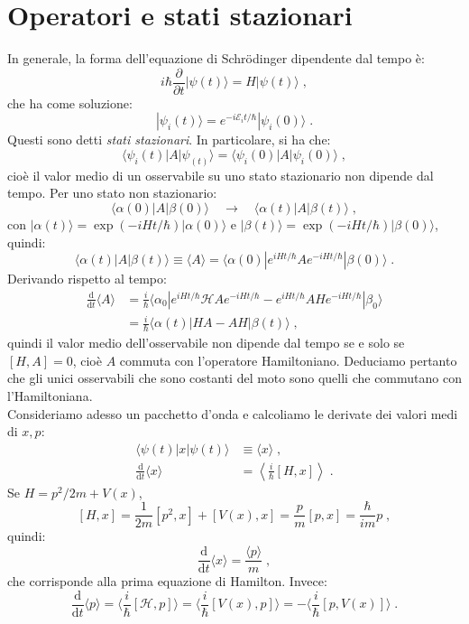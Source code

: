 \documentclass[12pt,a4paper]{report}
\theoremstyle{definition}
\newcommand{\ham}{\mathcal{H}}
\numberwithin{equation}{section}
\newcommand{\diff}[1][]{\mathrm{d}#1}
\newcommand{\bra}{\langle}
\newcommand{\ket}{\rangle}
\begin{document}
\section{Operatori e stati stazionari}
In generale, la forma dell'equazione di Schrödinger dipendente dal tempo è:
$$
i\hbar\frac{\partial}{\partial t}|\psi(t)\ket=H|\psi(t)\ket\;,
$$
che ha come soluzione:
$$
|\psi_i(t)\ket=e^{-i\mathcal{E}_it/\hbar}|\psi_i(0)\ket\;.
$$
Questi sono detti \textit{stati stazionari}. In particolare, si ha che:
\begin{equation}
\bra\psi_i(t)|A|\psi_(t)\ket=\bra\psi_i(0)|A|\psi_i(0)\ket\;,
\end{equation}
cioè il valor medio di un osservabile su uno stato stazionario non dipende dal tempo. Per uno stato non stazionario:
$$
\bra\alpha(0)|A|\beta(0)\ket \quad \longrightarrow\quad \bra\alpha(t)|A|\beta(t)\ket\;,
$$
con $|\alpha(t)\ket=\exp(-iH t/\hbar)|\alpha(0)\ket$ e $|\beta(t)\ket=\exp(-iH t/\hbar)|\beta(0)\ket$, quindi:
$$
\bra\alpha(t)|A|\beta(t)\ket\equiv \bra A\ket =\bra\alpha(0)|e^{iH t/\hbar}Ae^{-iH t/\hbar}|\beta(0)\ket\;.
$$
Derivando rispetto al tempo:
\begin{align*}
\frac{\mathrm{d}}{\diff{t}}\bra A\ket &= \frac{i}{\hbar}\bra \alpha_0|e^{iH t/\hbar}\ham Ae^{-iH t/\hbar}-e^{iH t/\hbar}AH e^{-iH t/\hbar}|\beta_0\ket \\
&= \frac{i}{\hbar}\bra\alpha(t)|H A-AH|\beta(t)\ket\;,
\end{align*}
quindi il valor medio dell'osservabile non dipende dal tempo se e solo se $[H,A]=0$, cioè $A$ commuta con l'operatore Hamiltoniano. Deduciamo pertanto che gli unici osservabili che sono costanti del moto sono quelli che commutano con l'Hamiltoniana. \\
Consideriamo adesso un pacchetto d'onda e calcoliamo le derivate dei valori medi di $x,p$:
\begin{align*}
\bra\psi(t)|x|\psi(t)\ket &\equiv \bra x\ket\;, \\
\frac{\mathrm{d}}{\mathrm{d}t}\bra x\ket&=\left\langle\frac{i}{\hbar}[H,x]\right\rangle\;.
\end{align*}
Se $H=p^2/2m+V(x)$,
$$
[H,x]=\frac{1}{2m}[p^2,x]+[V(x),x]=\frac{p}{m}[p,x]=\frac{\hbar}{im}p\;,
$$
quindi:
\begin{equation}
\frac{\mathrm{d}}{\diff{t}}\bra x \ket=\frac{\bra p\ket}{m}\;,
\end{equation}
che corrisponde alla prima equazione di Hamilton. Invece:
$$
\frac{\mathrm{d}}{\diff{t}}\bra p\ket=\bra\frac{i}{\hbar}[\ham,p]\ket=\bra \frac{i}{\hbar}[V(x),p]\ket=
-\bra\frac{i}{\hbar}[p,V(x)]\ket\;.
$$
\end{document}
